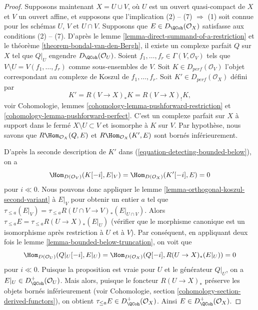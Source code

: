 \begin{proof}
\medskip\noindent
Supposons maintenant $X = U \cup V$, où $U$ est un ouvert quasi-compact de $X$ et
$V$ un ouvert affine, et supposons que l'implication (2) -- (7) $\Rightarrow$ (1)
soit connue pour les schémas $U$, $V$ et $U \cap V$.
Supposons que $E \in D_\QCoh(\mathcal{O}_X)$ satisfasse aux conditions (2) -- (7).
D'après le lemme \ref{lemma-direct-summand-of-a-restriction} et le
théorème \ref{theorem-bondal-van-den-Bergh}, il existe un complexe parfait
$Q$ sur $X$ tel que $Q|_U$ engendre $D_\QCoh (\mathcal{O}_U)$. 
Soient $f_1, \dots , f_r \in \Gamma (V, \mathcal{O}_V)$
tels que $V \setminus U = V(f_1, \dots , f_r)$ comme sous-ensembles de
$V$. Soit $K \in D_{perf}(\mathcal{O}_V)$ l'objet
correspondant au complexe de Koszul de $f_1, \dots , f_r$.
Soit $K' \in D_{perf}(\mathcal{O}_X)$ défini par
\begin{equation}
\label{equation-detecting-bounded-below}
K' = R (V \to X)_* K = R (V \to X)_! K,
\end{equation}
voir Cohomologie, lemmes \ref{cohomology-lemma-pushforward-restriction} et
\ref{cohomology-lemma-pushforward-perfect}. C'est un complexe parfait
sur $X$ à support dans le fermé $X \setminus U \subset V$
et isomorphe à $K$ sur $V$. Par hypothèse, nous savons que
$R\Hom_{\mathcal{O}_X}(Q, E)$ et
$R\Hom_{\mathcal{O}_X}(K', E)$ sont bornés inférieurement.

\medskip\noindent
D'après la seconde description de $K'$ dans (\ref{equation-detecting-bounded-below}),
on a
$$
\Hom_{D(\mathcal{O}_V)}(K[-i], E|_V) = \Hom_{D(\mathcal{O}_X)}(K'[-i], E) = 0
$$
pour $i \ll 0$. Nous pouvons donc appliquer le
lemme \ref{lemma-orthogonal-koszul-second-variant} à $E|_V$ pour
obtenir un entier $a$ tel que
$\tau_{\leq a}(E|_V) = \tau_{\leq a} R(U \cap V \to V)_*(E|_{U \cap V})$.
Alors $\tau_{\leq a} E = \tau_{\leq a} R(U \to X)_*(E|_U)$
(vérifier que le morphisme canonique est un isomorphisme après restriction à
$U$ et à $V$). Par conséquent, en appliquant deux fois le lemme \ref{lemma-bounded-below-truncation},
on voit que
$$
\Hom_{D(\mathcal{O}_U)}(Q|_U [-i], E|_U) =
\Hom_{D(\mathcal{O}_X)}(Q[-i], R (U \to X)_* (E|_U)) = 0
$$
pour $i \ll 0$. Puisque la proposition est vraie pour $U$ et le générateur
$Q|_U$, on a $E|_U \in D^+_\QCoh (\mathcal{O}_U)$. Mais alors, puisque
le foncteur $R(U \to X)_*$ préserve les objets bornés inférieurement
(voir Cohomologie, section \ref{cohomology-section-derived-functors}), on obtient
$\tau_{\leq a} E \in D^+_\QCoh(\mathcal{O}_X)$. Ainsi 
$E \in D^+_\QCoh (\mathcal{O}_X)$.
\end{proof}







